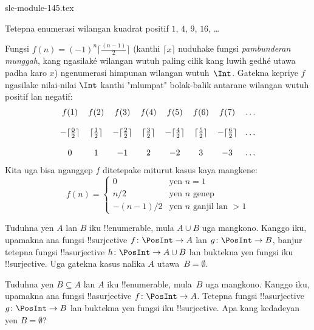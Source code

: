 \begin{filecontents*}[overwrite]{slc-module-145.tex}
\begin{prob}
Tetepna enumerasi wilangan kuadrat positif $1$, $4$, $9$, $16$, \dots
\end{prob}

\begin{ex}
Fungsi $f(n) = (-1)^{n} \lceil \frac{(n-1)}{2}\rceil$ (kanthi
$\lceil x \rceil$ nuduhake fungsi \emph{pambunderan munggah}, kang ngasilaké
wilangan wutuh paling cilik kang luwih gedhé utawa padha karo $x$) ngenumerasi himpunan
wilangan wutuh~$\Int$. Gatekna kepriye $f$ ngasilake nilai-nilai $\Int$
kanthi "mlumpat" bolak-balik antarane wilangan wutuh positif lan negatif:
\[
\begin{array}{c c c c c c c c}
f(1) & f(2) & f(3) & f(4) & f(5) & f(6) & f(7) & \dots \\ \\
- \lceil \tfrac{0}{2} \rceil & \lceil \tfrac{1}{2}\rceil & - \lceil \tfrac{2}{2} \rceil & \lceil \tfrac{3}{2} \rceil & - \lceil \tfrac{4}{2} \rceil  & \lceil \tfrac{5}{2}
\rceil & - \lceil \tfrac{6}{2} \rceil & \dots \\ \\
0 & 1 & -1 & 2 & -2 & 3 & -3 & \dots
\end{array}
\]
Kita uga bisa nganggep $f$ ditetepake miturut kasus kaya mangkene:
\[
f(n) = \begin{cases}
  0 & \text{yen $n = 1$}\\
  n/2 & \text{yen $n$ genep}\\
  -(n-1)/2 & \text{yen $n$ ganjil lan $>1$}
  \end{cases}
\]
\end{ex}

\begin{prob}
  Tuduhna yen $A$ lan $B$ iku !!{enumerable}, mula $A \cup B$ uga mangkono.
  Kanggo iku, upamakna ana fungsi !!{surjective} $f\colon \PosInt \to
  A$ lan $g\colon \PosInt \to B$, banjur tetepna fungsi !!a{surjective}
  $h\colon \PosInt \to A \cup B$ lan buktekna yen fungsi iku
  !!{surjective}. Uga gatekna kasus nalika $A$ utawa~$B = \emptyset$.
\end{prob}

\begin{prob}
  Tuduhna yen $B \subseteq A$ lan $A$ iku !!{enumerable}, mula~$B$ uga mangkono.
  Kanggo iku, upamakna ana fungsi !!a{surjective} $f\colon \PosInt \to
  A$. Tetepna fungsi !!a{surjective} $g\colon \PosInt \to B$ lan buktekna
  yen fungsi iku !!{surjective}. Apa kang kedadeyan yen $B = \emptyset$?
\end{prob}


\end{filecontents*}
